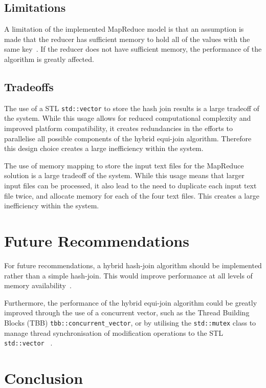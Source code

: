 \documentclass[10pt,twocolumn]{witseiepaper}
\begin{document}
\subsection{Limitations}
A limitation of the implemented MapReduce model is that an assumption is made that the reducer has sufficient memory to hold all of the values with the same key~\cite{mapReduceJoin}. If the reducer does not have sufficient memory, the performance of the algorithm is greatly affected.

\subsection{Tradeoffs} \label{sec:tradeoffs}
The use of a STL \texttt{std::vector} to store the hash join results is a large tradeoff of the system. While this usage allows for reduced computational complexity and improved platform compatibility, it creates redundancies in the efforts to parallelise all possible components of the hybrid equi-join algorithm. Therefore this design choice creates a large inefficiency within the system.

The use of memory mapping to store the input text files for the MapReduce solution is a large tradeoff of the system. While this usage means that larger input files can be processed, it also lead to the need to duplicate each input text file twice, and allocate memory for each of the four text files. This creates a large inefficiency within the system.

\section{Future Recommendations}
For future recommendations, a hybrid hash-join algorithm should be implemented rather than a simple hash-join. This would improve performance at all levels of memory availability~\cite{evaluating4JoinAlgorithms}.

Furthermore, the performance of the hybrid equi-join algorithm could be greatly improved through the use of a concurrent vector, such as the Thread Building Blocks (TBB) \texttt{tbb::concurrent\_vector}, or by utilising the \texttt{std::mutex} class to manage thread synchronisation of modification operations to the STL \texttt{std::vector} \cite{tbb}~\cite{mutex}.

\section{Conclusion}



\end{document}
